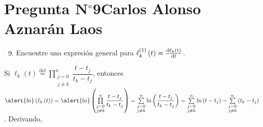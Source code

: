 \section{Pregunta N$^{\circ}$9\qquad Carlos Alonso Aznarán Laos}

\begin{frame}
    \begin{enumerate}\setcounter{enumi}{8}
        \item

              Encuentre una expresión general para
              \begin{math}
                  \ell_{k}^{\left(1\right)}\left(t\right)=
                  \diff{\ell_{k}\left(t\right)}{t}
              \end{math}.
    \end{enumerate}

    \begin{solution}
        Si
        \begin{math}
            \ell_{k}
            \left(t\right)
            \overset{\text{def}}{=}
            \prod\limits_{\substack{j=0\\j\neq k}}^{n}
            \dfrac{t-t_{j}}{t_{k}-t_{j}}
        \end{math}, entonces
        \begin{math}
            \alert{\ln}
            \left(
            \ell_{k}
            \left(t\right)
            \right)=
            \alert{\ln}
            \left(
            \prod\limits_{\substack{j=0\\j\neq k}}^{n}
            \dfrac{t-t_{j}}{t_{k}-t_{j}}
            \right)=
            \sum\limits_{\substack{j=0\\j\neq k}}^{n}
            \ln
            \left(
            \dfrac{t-t_{j}}{t_{k}-t_{j}}
            \right)=
            \sum\limits_{\substack{j=0\\j\neq k}}^{n}
            \ln
            \left(
            t-t_{j}
            \right)-
            \sum\limits_{\substack{j=0\\j\neq k}}^{n}
            \left(
            t_{k}-t_{j}
            \right)
        \end{math}.
        Derivando,


\end{solution}
\end{frame}
